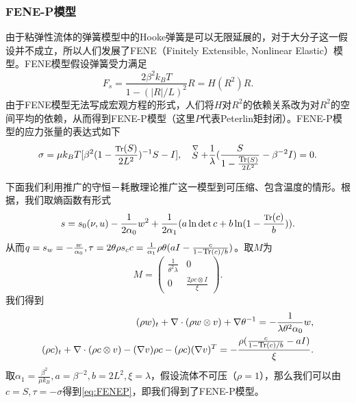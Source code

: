 	\subsubsection{FENE-P模型}
	由于粘弹性流体的弹簧模型中的Hooke弹簧是可以无限延展的，对于大分子这一假设并不成立，所以人们发展了FENE（Finitely Extensible, Nonlinear Elastic）模型。FENE模型假设弹簧受力满足
	\begin{equation*}
		F_s = \frac{2 \beta^2 k_B T}{1-(|R|/L)^2} R = H(R^2)R.
	\end{equation*}
	由于FENE模型无法写成宏观方程的形式\cite{le2009multiscale}，人们将$H$对$R^2$的依赖关系改为对$R^2$的空间平均的依赖，从而得到FENE-P模型（这里$P$代表Peterlin矩封闭\cite{larson1999structure,le2009multiscale,masmoudi2011global}）。FENE-P模型的应力张量的表达式如下\cite{larson1999structure}
	\begin{equation} \label{eq:FENEP}
		\sigma = \mu k_B T [ \beta^2 (1- \frac{\text{\footnotesize $\mbox{Tr}$}(S)}{2L^2})^{-1}S - I],  \quad \stackrel{\nabla} S + \frac{1}{\lambda} (\frac{S}{1-\frac{\text{\footnotesize $\mbox{Tr}$}(S)}{2L^2}} - \beta^{-2}I) = 0. 
	\end{equation}

	下面我们利用推广的守恒－耗散理论推广这一模型到可压缩、包含温度的情形。根据\cite{masmoudi2011global,hu2007new}，我们取熵函数有形式
	\begin{equation*}
		s = s_0(\nu,u)  - \frac{1}{2  \alpha_0} w^2 + \frac{1}{2 \alpha_1} (a \ln \det c + b \ln(1-\frac{\text{\footnotesize $\mbox{Tr}$} (c)}{b})).
	\end{equation*}
	从而$q=s_w=-\frac{ w}{\alpha_0},\tau =  2\theta \rho s_c c = \frac{1}{\alpha_1} \rho \theta (a I-\frac{c}{1-{\text{\footnotesize $\mbox{Tr}$} (c)}/{b}})$。取$M$为
	\begin{equation*}
		M = \left( \begin{array}{ccc} 
			\frac{1}{\theta^2 \lambda} & 0 \\
			0 &  \frac{2 \rho  c \otimes I}{\xi}   
		\end{array} \right).
	\end{equation*}
	我们得到
	\begin{subequations}\label{eq:generalizedFENEP}
		\begin{align}
			(\rho w)_t + \nabla \cdot (\rho w \otimes v) + \nabla \theta^{-1} = -\frac{1}{\lambda \theta^2 \alpha_0} w, \\
			(\rho c)_t +  \nabla \cdot (\rho c \otimes v) - (\nabla v) \rho c - (\rho c) (\nabla v)^T  = -\frac{\rho (\frac{c}{1-	{\text{\footnotesize $\mbox{Tr}$}(c)}/{b}}-a I) }{\xi}.
		\end{align}
	\end{subequations}
	取$\alpha_1 = \frac{\beta^2}{\mu k_B},a=\beta^{-2},b=2L^2,\xi = \lambda$，假设流体不可压（$\rho=1$），那么我们可以由$c=S,\tau = -\sigma$得到\eqref{eq:FENEP}，即我们得到了FENE-P模型。

